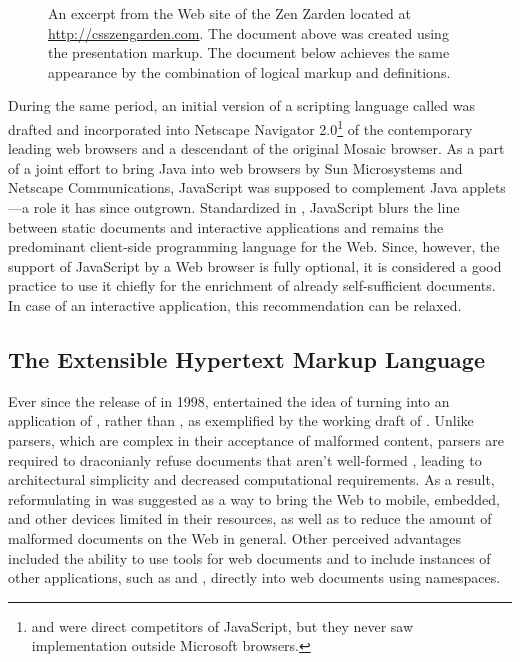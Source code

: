 \documentclass{book}
\begin{document}
\begin{figure}
  \caption{An excerpt from the Web site of the  Zen Zarden
    located at \protect\url{http://csszengarden.com}. The document above was
    created using the  presentation markup. The document below
    achieves the same appearance by the combination of logical markup and
     definitions.}\bigskip
\end{figure}

During the same period, an initial version of a scripting language called
 \cite{ecma97} was drafted and incorporated into Netscape
Navigator 2.0\footnote{
   and  were direct competitors of JavaScript, but
  they never saw implementation outside Microsoft browsers.
} of the contemporary leading web browsers and a descendant of the original
Mosaic browser. As a part of a joint effort to bring Java into web browsers by
Sun Microsystems and Netscape Communications, JavaScript was supposed to
complement Java applets \cite{netscape95}---a role it has since outgrown.
Standardized in \citeyear{ecma97}, JavaScript blurs the line between static
documents and interactive applications and remains the predominant client-side
programming language for the Web. Since, however, the support of JavaScript by a
Web browser is fully optional, it is considered a good practice to use it
chiefly for the enrichment of already self-sufficient  documents.
In case of an interactive application, this recommendation can be relaxed.

\subsection{The Extensible Hypertext Markup Language}
Ever since the release of  in 1998,  entertained the
idea of turning  into an application of , rather than
, as exemplified by the working draft of \textcite{raggett98}.
Unlike  parsers, which are complex in their acceptance of
malformed content,  parsers are required to draconianly refuse
 documents that aren't well-formed \cite[Section~1.2,
Terminology]{bray98}, leading to architectural simplicity and decreased
computational requirements. As a result, reformulating  in
 was suggested as a way to bring the Web to mobile, embedded, and
other devices limited in their resources, as well as to reduce the amount of
malformed documents on the Web in general. Other perceived advantages included
the ability to use  tools for web documents and to include
instances of other  applications, such as  and
, directly into web documents using  namespaces.
\end{document}
